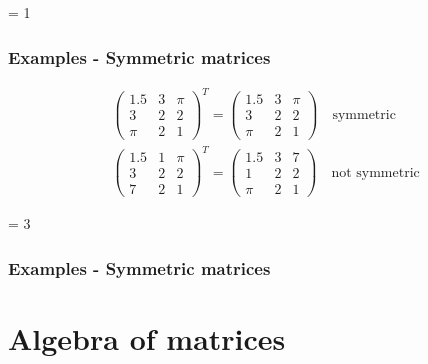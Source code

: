 \documentclass[usenames,dvipsnames,aspectratio=169,10pt]{beamer}
\def \EXAMPLEVERSION {3} %
\numberwithin{equation}{section}
\begin{document}
\ifnum \EXAMPLEVERSION = 1
\begin{frame}
\frametitle{Examples - Symmetric matrices}

\begin{align*}
&\begin{pmatrix}
1.5 & 3 & \pi \\
3   & 2 & 2 \\
\pi & 2 & 1
\end{pmatrix}^T
=
\begin{pmatrix}
1.5 & 3 & \pi \\
3   & 2 & 2 \\
\pi & 2 & 1
\end{pmatrix}
\quad \text{symmetric} \\
%
&\begin{pmatrix}
1.5 & 1 & \pi \\
3   & 2 & 2 \\
7 & 2 & 1
\end{pmatrix}^T
=
\begin{pmatrix}
1.5 & 3 & 7 \\
1   & 2 & 2 \\
\pi & 2 & 1
\end{pmatrix}
\quad \text{not symmetric}
\end{align*}
\end{frame}
\fi 


\ifnum \EXAMPLEVERSION = 3
\begin{frame}
\frametitle{Examples - Symmetric matrices}
\end{frame}
\fi 





\section{Algebra of matrices}
\end{document}
